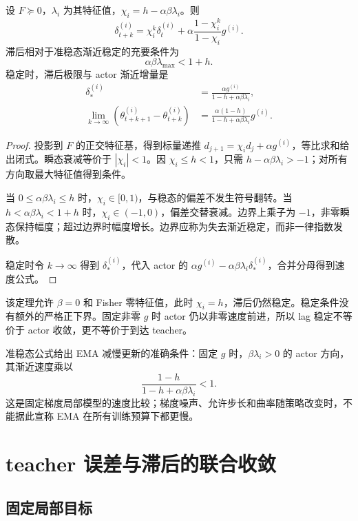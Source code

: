 \begin{theorem}
\label{thm:ema-lag-stability}
设 $F\succeq0$，$\lambda_i$ 为其特征值，$\chi_i=h-\alpha\beta\lambda_i$。则
\[
 \delta_{t+k}^{(i)}=\chi_i^k\delta_t^{(i)}
 +\alpha\frac{1-\chi_i^k}{1-\chi_i}g^{(i)}.
\]
滞后相对于准稳态渐近稳定的充要条件为
\[
 \alpha\beta\lambda_{\max}<1+h.
\]
稳定时，滞后极限与 actor 渐近增量是
\begin{align}
 \delta_*^{(i)}&=\frac{\alpha g^{(i)}}{1-h+\alpha\beta\lambda_i},\\
 \lim_{k\to\infty}(\theta_{t+k+1}^{(i)}-\theta_{t+k}^{(i)})
 &=\frac{\alpha(1-h)}{1-h+\alpha\beta\lambda_i}g^{(i)}.
\end{align}
\end{theorem}
\begin{proof}
投影到 $F$ 的正交特征基，得到标量递推 $d_{j+1}=\chi_i d_j+\alpha g^{(i)}$，等比求和给出闭式。瞬态衰减等价于 $|\chi_i|<1$。因 $\chi_i\le h<1$，只需 $h-\alpha\beta\lambda_i>-1$；对所有方向取最大特征值得到条件。

当 $0\le\alpha\beta\lambda_i\le h$ 时，$\chi_i\in[0,1)$，与稳态的偏差不发生符号翻转。当 $h<\alpha\beta\lambda_i<1+h$ 时，$\chi_i\in(-1,0)$，偏差交替衰减。边界上乘子为 $-1$，非零瞬态保持幅度；超过边界时幅度增长。边界应称为失去渐近稳定，而非一律指数发散。

稳定时令 $k\to\infty$ 得到 $\delta_*^{(i)}$，代入 actor 的 $\alpha g^{(i)}-\alpha\beta\lambda_i\delta_*^{(i)}$，合并分母得到速度公式。
\end{proof}

该定理允许 $\beta=0$ 和 Fisher 零特征值，此时 $\chi_i=h$，滞后仍然稳定。稳定条件没有额外的严格正下界。固定非零 $g$ 时 actor 仍以非零速度前进，所以 lag 稳定不等价于 actor 收敛，更不等价于到达 teacher。

准稳态公式给出 EMA 减慢更新的准确条件：固定 $g$ 时，$\beta\lambda_i>0$ 的 actor 方向，其渐近速度乘以
\[
 \frac{1-h}{1-h+\alpha\beta\lambda_i}<1.
\]
这是固定梯度局部模型的速度比较；梯度噪声、允许步长和曲率随策略改变时，不能据此宣称 EMA 在所有训练预算下都更慢。

\section{teacher 误差与滞后的联合收敛}

\subsection{固定局部目标}

